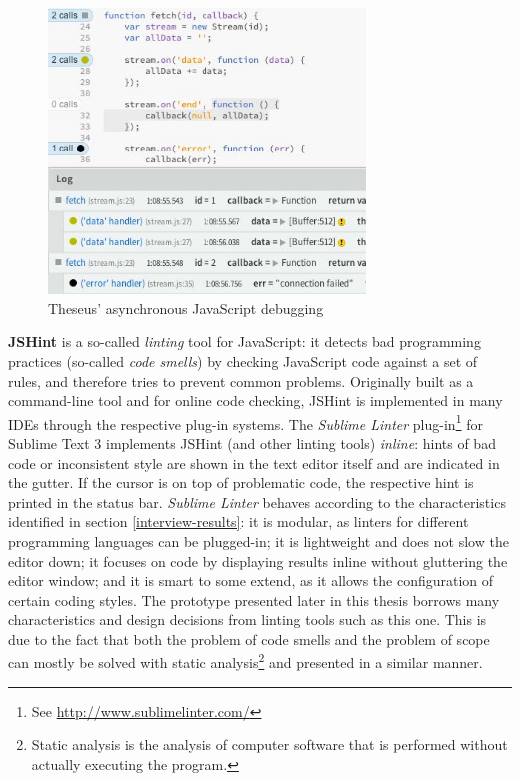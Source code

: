 \begin{figure}[htbp]
\centering
\includegraphics[keepaspectratio,width=0.75\textwidth,height=0.75\textheight]{img/theseus.jpg}
\caption{Theseus’ asynchronous JavaScript debugging \cite{lieber}}
\label{fig:theseus}
\end{figure}

\textbf{JSHint} is a so-called \emph{linting} tool for JavaScript: it
detects bad programming practices (so-called \emph{code smells}) by
checking JavaScript code against a set of rules, and therefore tries to
prevent common problems. Originally built as a command-line tool and for
online code checking, JSHint is implemented in many IDEs through the
respective plug-in systems. The \emph{Sublime Linter} plug-in\footnote{See
  \url{http://www.sublimelinter.com/}} for Sublime Text 3 implements
JSHint (and other linting tools) \emph{inline}: hints of bad code or
inconsistent style are shown in the text editor itself and are indicated
in the gutter. If the cursor is on top of problematic code, the
respective hint is printed in the status bar. \emph{Sublime Linter}
behaves according to the characteristics identified in section
\ref{interview-results}: it is modular, as linters for different
programming languages can be plugged-in; it is lightweight and does not
slow the editor down; it focuses on code by displaying results inline
without gluttering the editor window; and it is smart to some extend, as
it allows the configuration of certain coding styles. The prototype
presented later in this thesis borrows many characteristics and design
decisions from linting tools such as this one. This is due to the fact
that both the problem of code smells and the problem of scope can mostly
be solved with static
analysis\footnote{Static analysis is the analysis of computer software that is performed without actually executing the program.}
and presented in a similar manner.

